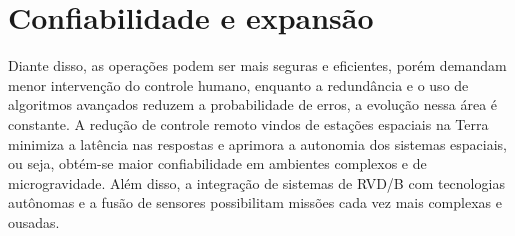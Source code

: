 \section{Confiabilidade e expansão}

Diante disso, as operações podem ser mais seguras e eficientes, porém demandam menor intervenção do controle humano, enquanto a redundância e o uso de algoritmos avançados reduzem a probabilidade de erros, a evolução nessa área é constante.
A redução de controle remoto vindos de estações espaciais na Terra minimiza a latência nas respostas e aprimora a autonomia dos sistemas espaciais, ou seja, obtém-se maior confiabilidade em ambientes complexos e de microgravidade.
Além disso, a integração de sistemas de RVD/B com tecnologias autônomas e a fusão de sensores possibilitam missões cada vez mais complexas e ousadas.
